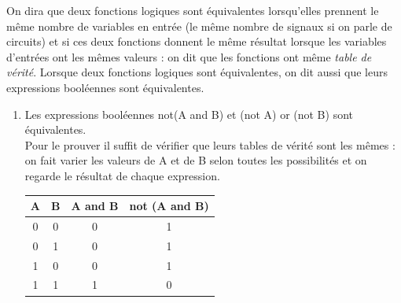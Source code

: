 \begin{definition}
    On dira que deux fonctions logiques sont équivalentes lorsqu'elles prennent le même nombre de variables en entrée (le même nombre de signaux si on parle de circuits) et si ces deux fonctions donnent le même résultat lorsque les variables d'entrées ont les mêmes valeurs : on dit que les fonctions ont même \textit{table de vérité}.
    Lorsque deux fonctions logiques sont équivalentes, on dit aussi que leurs expressions booléennes sont équivalentes.
\end{definition}

\begin{exemple}[s]
    \begin{enumerate}[--]
        \item 		Les expressions booléennes not(A and B) et (not A) or (not B) sont équivalentes.\\
              Pour le prouver il suffit de vérifier que leurs tables de vérité sont les mêmes : on fait varier les valeurs de A et de B selon toutes les possibilités et on regarde le résultat de chaque expression.
              \begin{center}
                  \begin{tabular}{|c|c|c|c|}
                      \hline\rowcolor{UGLiOrange}
                      {\boxfont\color{white}
                      A} & {\boxfont\color{white}B} & {\boxfont\color{white}A and B} & {\boxfont\color{white}not (A and B)} \\
                      \hline
                      0  & 0                        & 0                              & \cellcolor{UGLiOrange!25}	1          \\
                      \hline
                      0  & 1                        & 0                              & \cellcolor{UGLiOrange!25}	1          \\
                      \hline
                      1  & 0                        & 0                              & \cellcolor{UGLiOrange!25}	1          \\
                      \hline
                      1  & 1                        & 1                              & \cellcolor{UGLiOrange!25}	0          \\
                      \hline
                  \end{tabular}\\[2em]


\end{center}
\end{enumerate}
\end{exemple}
